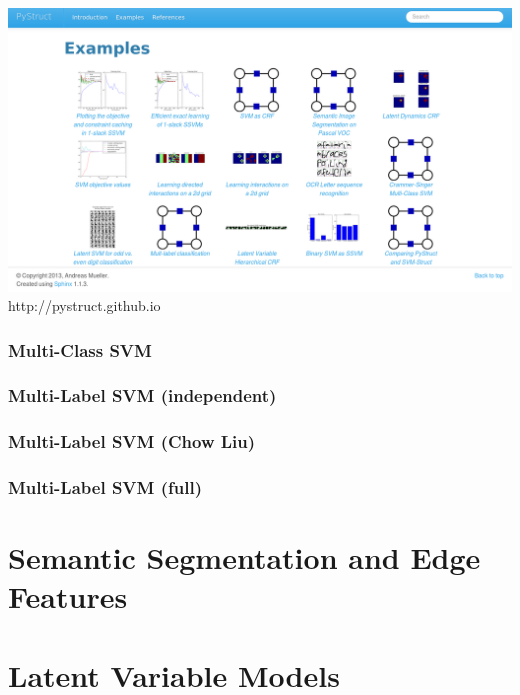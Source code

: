 \documentclass[final,ignorenonframetext,compress]{beamer}
\begin{document}
    \begin{frame}
        \begin{center}
            \includegraphics[width=\linewidth]{images/example_gallery}\\
            http://pystruct.github.io
        \end{center}
    \end{frame}

\begin{frame}
    \frametitle{Multi-Class SVM}
\end{frame}

\begin{frame}
    \frametitle{Multi-Label SVM (independent)}
\end{frame}

\begin{frame}
    \frametitle{Multi-Label SVM (Chow Liu)}
\end{frame}

\begin{frame}
    \frametitle{Multi-Label SVM (full)}
\end{frame}

\section{Semantic Segmentation and Edge Features}

\section{Latent Variable Models}
\end{document}
